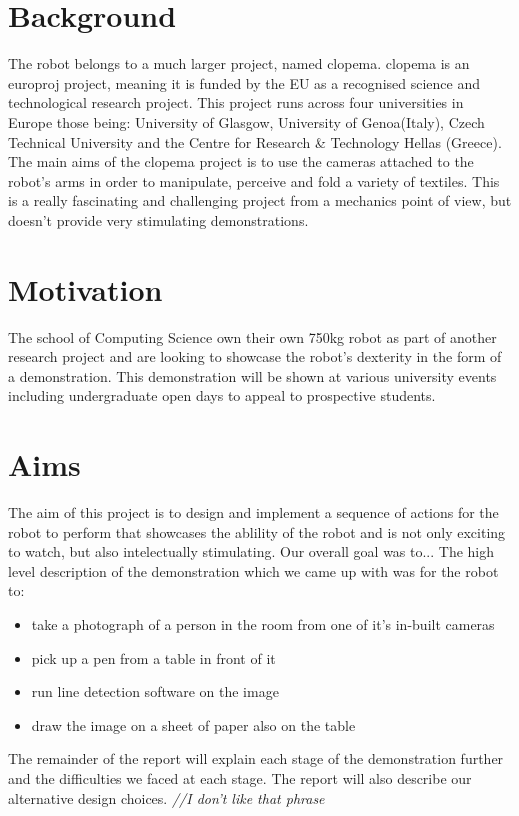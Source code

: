 \documentclass{l3proj}
\begin{document}
\section{Background}
The robot belongs to a much larger project, named \gls{clopema}. \gls{clopema} is an \gls{europroj} project, meaning it is funded by the EU as a recognised science and technological research project. This project runs across four universities in Europe those being: University of Glasgow, University of Genoa(Italy), Czech Technical University and the Centre for Research \& Technology Hellas (Greece). 
The main aims of the \gls{clopema} project is to use the cameras attached to the robot's arms in order to manipulate, perceive and fold a variety of textiles. This is a really fascinating and challenging project from a mechanics point of view, but doesn't provide very stimulating demonstrations.
\section{Motivation}
The school of Computing Science own their own 750kg robot as part of another research project and are looking to showcase the robot's dexterity in the form of a demonstration. This demonstration will be shown at various university events including undergraduate open days to appeal to prospective students.
\section{Aims}
The aim of this project is to design and implement a sequence of actions for the robot to perform that showcases the ablility of the robot and is not only exciting to watch, but also intelectually stimulating. 
Our overall goal was to...
The high level description of the demonstration which we came up with was for the robot to:
\begin{itemize}
\item take a photograph of a person in the room from one of it's in-built cameras
\item pick up a pen from a table in front of it
\item run line detection software on the image
\item draw the image on a sheet of paper also on the table
\end{itemize}
The remainder of the report will explain each stage of the demonstration further and the difficulties we faced at each stage. The report will also describe our alternative design choices. \textit{ //I don't like that phrase}
%
\end{document}
